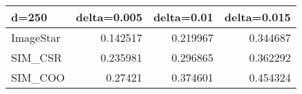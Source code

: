 \begin{tabular}{lrrr}
\hline
 d=250     &   delta=0.005 &   delta=0.01 &   delta=0.015 \\
\hline
 ImageStar &      0.142517 &     0.219967 &      0.344687 \\
 SIM\_CSR   &      0.235981 &     0.296865 &      0.362292 \\
 SIM\_COO   &      0.27421  &     0.374601 &      0.454324 \\
\hline
\end{tabular}
